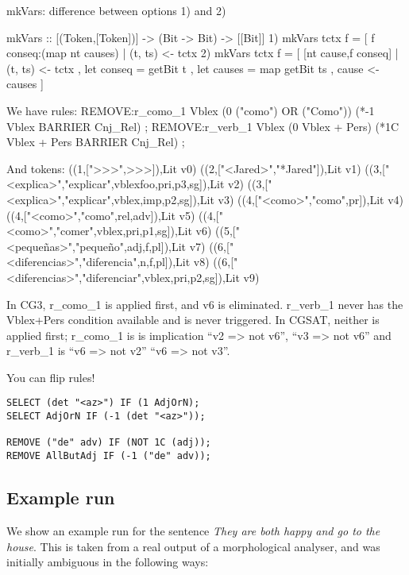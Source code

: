 \documentclass[a4paper, 11pt]{article}
\begin{document}
mkVars: difference between options 1) and 2)

        mkVars :: [(Token,[Token])] -> (Bit -> Bit) -> [[Bit]]
1)        mkVars tctx f = [ f conseq:(map nt causes) | (t, ts) <- tctx
2)        mkVars tctx f = [ [nt cause,f conseq] | (t, ts) <- tctx
                                               , let conseq = getBit t
                                               , let causes = map getBit ts
                                               , cause <- causes ]



We have rules:
REMOVE:r_como_1 Vblex (0 ("como") OR ("Como")) (*-1 Vblex BARRIER Cnj_Rel) ;
REMOVE:r_verb_1 Vblex (0 Vblex + Pers) (*1C Vblex + Pers BARRIER
Cnj_Rel) ;

And tokens:
((1,[">>>",>>>]),Lit v0)
((2,["<Jared>","*Jared"]),Lit v1)
((3,["<explica>","explicar",vblexfoo,pri,p3,sg]),Lit v2)
((3,["<explica>","explicar",vblex,imp,p2,sg]),Lit v3)
((4,["<como>","como",pr]),Lit v4)
((4,["<como>","como",rel,adv]),Lit v5)
((4,["<como>","comer",vblex,pri,p1,sg]),Lit v6)
((5,["<pequeñas>","pequeño",adj,f,pl]),Lit v7)
((6,["<diferencias>","diferencia",n,f,pl]),Lit v8)
((6,["<diferencias>","diferenciar",vblex,pri,p2,sg]),Lit v9)


In CG3, r_como_1 is applied first, and v6 is eliminated. r_verb_1
never has the Vblex+Pers condition available and is never triggered.
In CGSAT, neither is applied first; r_como_1 is is implication ``v2 =>
not v6'', ``v3 => not v6'' and r_verb_1 is ``v6 => not v2'' ``v6 => not v3''.

You can flip rules!

\begin{verbatim}
SELECT (det "<az>") IF (1 AdjOrN);
SELECT AdjOrN IF (-1 (det "<az>"));

REMOVE ("de" adv) IF (NOT 1C (adj));
REMOVE AllButAdj IF (-1 ("de" adv));
\end{verbatim}

\subsection{Example run}

We show an example run for the sentence \emph{They are both happy and go to the house}. This is
taken from a real output of a morphological analyser, and was
initially ambiguous in the following ways:
\end{document}
